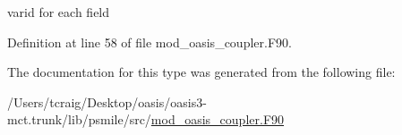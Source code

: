 varid for each field 



Definition at line 58 of file mod\+\_\+oasis\+\_\+coupler.\+F90.



The documentation for this type was generated from the following file\+:\begin{DoxyCompactItemize}
\item 
/\+Users/tcraig/\+Desktop/oasis/oasis3-\/mct.\+trunk/lib/psmile/src/\hyperlink{mod__oasis__coupler_8_f90}{mod\+\_\+oasis\+\_\+coupler.\+F90}\end{DoxyCompactItemize}
